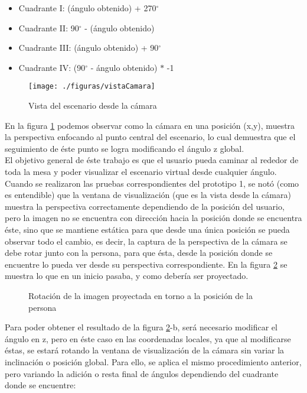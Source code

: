 \documentclass[a4paper,openright,12pt]{report}
\begin{document}
\begin{itemize}
	\item Cuadrante I: (ángulo obtenido) + 270$^{\circ}$
	\item Cuadrante II: 90$^{\circ}$ - (ángulo obtenido)
	\item Cuadrante III: (ángulo obtenido) + 90$^{\circ}$
	\item Cuadrante IV: (90$^{\circ}$ - ángulo obtenido) $*$ -1
\end{itemize}
\begin{figure}[thb]
	\centering
	\texttt{[image: ./figuras/vistaCamara]}
	\caption{Vista del escenario desde la cámara} \label{fig:vistaCamara}
\end{figure}
En la figura \ref{fig:vistaCamara} podemos observar como la cámara en una posición (x,y), muestra la perspectiva enfocando al punto central del escenario, lo cual demuestra que el seguimiento de éste punto se logra modificando el ángulo z global.\\
El objetivo general de éste trabajo es que el usuario pueda caminar al rededor de toda la mesa y poder visualizar el escenario virtual desde cualquier ángulo. Cuando se realizaron las pruebas correspondientes del prototipo 1, se notó (como es entendible) que la ventana de visualización (que es la vista desde la cámara) muestra la perspectiva correctamente dependiendo de la posición del usuario, pero la imagen no se encuentra con dirección hacia la posición donde se encuentra éste, sino que se mantiene estática para que desde una única posición se pueda observar todo el cambio, es decir, la captura de la perspectiva de la cámara se debe rotar junto con la persona, para que ésta, desde la posición donde se encuentre lo pueda ver desde su perspectiva correspondiente. En la figura \ref{fig:vistas} se muestra lo que en un inicio pasaba, y como debería ser proyectado.\\
\begin{figure}[thb]
	\centering
	\hspace*{1cm}
	\caption{Rotación de la imagen proyectada en torno a la posición de la persona} \label{fig:vistas}
\end{figure}
Para poder obtener el resultado de la figura \ref{fig:vistas}-b, será necesario modificar el ángulo en z, pero en éste caso en las coordenadas locales, ya que al modificarse éstas, se estará rotando la ventana de visualización de la cámara sin variar la inclinación o posición global. Para ello, se aplica el mismo procedimiento anterior, pero variando la adición o resta final de ángulos dependiendo del cuadrante donde se encuentre:
\end{document}
